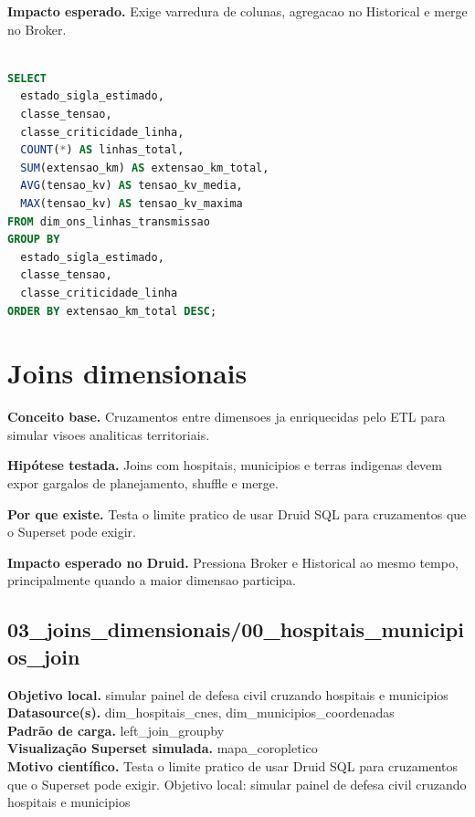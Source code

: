 \documentclass[11pt,a4paper]{article}
\begin{document}
\textbf{Impacto esperado.} Exige varredura de colunas, agregacao no Historical e merge no Broker.

\begin{lstlisting}[language=SQL]

SELECT
  estado_sigla_estimado,
  classe_tensao,
  classe_criticidade_linha,
  COUNT(*) AS linhas_total,
  SUM(extensao_km) AS extensao_km_total,
  AVG(tensao_kv) AS tensao_kv_media,
  MAX(tensao_kv) AS tensao_kv_maxima
FROM dim_ons_linhas_transmissao
GROUP BY
  estado_sigla_estimado,
  classe_tensao,
  classe_criticidade_linha
ORDER BY extensao_km_total DESC;

\end{lstlisting}

\clearpage

\section{Joins dimensionais}

\textbf{Conceito base.} Cruzamentos entre dimensoes ja enriquecidas pelo ETL para simular visoes analiticas territoriais.

\textbf{Hipótese testada.} Joins com hospitais, municipios e terras indigenas devem expor gargalos de planejamento, shuffle e merge.

\textbf{Por que existe.} Testa o limite pratico de usar Druid SQL para cruzamentos que o Superset pode exigir.

\textbf{Impacto esperado no Druid.} Pressiona Broker e Historical ao mesmo tempo, principalmente quando a maior dimensao participa.

\subsection{03\_joins\_dimensionais/00\_hospitais\_municipios\_join}

\textbf{Objetivo local.} simular painel de defesa civil cruzando hospitais e municipios\\

\textbf{Datasource(s).} dim\_hospitais\_cnes, dim\_municipios\_coordenadas\\

\textbf{Padrão de carga.} left\_join\_groupby\\

\textbf{Visualização Superset simulada.} mapa\_coropletico\\

\textbf{Motivo científico.} Testa o limite pratico de usar Druid SQL para cruzamentos que o Superset pode exigir. Objetivo local: simular painel de defesa civil cruzando hospitais e municipios\\
\end{document}
